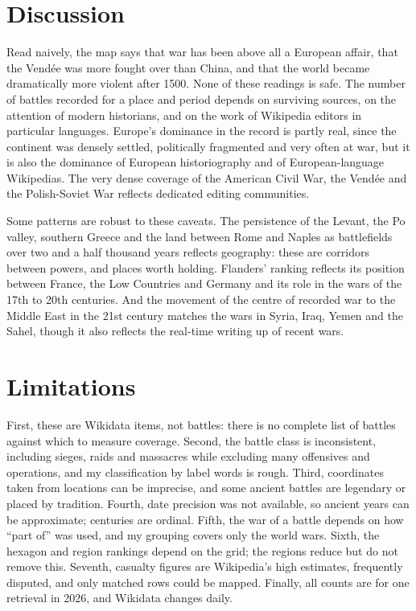 \documentclass[11pt,a4paper]{article}
\begin{document}
\section{Discussion}
Read naively, the map says that war has been above all a European affair, that the Vendée was more fought over than China, and that the world became dramatically more violent after 1500. None of these readings is safe. The number of battles recorded for a place and period depends on surviving sources, on the attention of modern historians, and on the work of Wikipedia editors in particular languages. Europe's dominance in the record is partly real, since the continent was densely settled, politically fragmented and very often at war, but it is also the dominance of European historiography and of European-language Wikipedias. The very dense coverage of the American Civil War, the Vendée and the Polish-Soviet War reflects dedicated editing communities.

Some patterns are robust to these caveats. The persistence of the Levant, the Po valley, southern Greece and the land between Rome and Naples as battlefields over two and a half thousand years reflects geography: these are corridors between powers, and places worth holding. Flanders' ranking reflects its position between France, the Low Countries and Germany and its role in the wars of the 17th to 20th centuries. And the movement of the centre of recorded war to the Middle East in the 21st century matches the wars in Syria, Iraq, Yemen and the Sahel, though it also reflects the real-time writing up of recent wars.

\section{Limitations}
First, these are Wikidata items, not battles: there is no complete list of battles against which to measure coverage. Second, the battle class is inconsistent, including sieges, raids and massacres while excluding many offensives and operations, and my classification by label words is rough. Third, coordinates taken from locations can be imprecise, and some ancient battles are legendary or placed by tradition. Fourth, date precision was not available, so ancient years can be approximate; centuries are ordinal. Fifth, the war of a battle depends on how ``part of'' was used, and my grouping covers only the world wars. Sixth, the hexagon and region rankings depend on the grid; the regions reduce but do not remove this. Seventh, casualty figures are Wikipedia's high estimates, frequently disputed, and only matched rows could be mapped. Finally, all counts are for one retrieval in 2026, and Wikidata changes daily.
\end{document}
